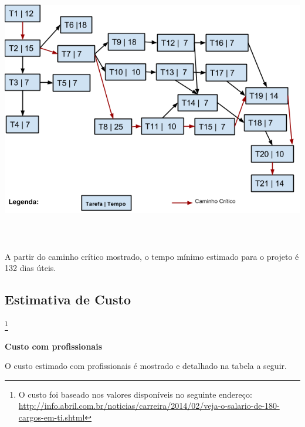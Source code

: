 {\centering  \includegraphics[width=16.722cm,height=11.834cm]{PlanodeProjeto-img002.png} \par}

\bigskip

A partir do caminho crítico mostrado, o tempo mínimo estimado para o projeto é 132 dias úteis.


\bigskip


\bigskip

\clearpage
\subsection{\textcolor[rgb]{0.078431375,0.09411765,0.13725491}{Estimativa de Custo}}\footnote{
\textcolor[rgb]{0.078431375,0.09411765,0.13725491}{O custo foi baseado nos valores disponíveis no seguinte endereço:
}\url{http://info.abril.com.br/noticias/carreira/2014/02/veja-o-salario-de-180-cargos-em-ti.shtml}\par }


\bigskip

\textbf{\textcolor[rgb]{0.078431375,0.09411765,0.13725491}{Custo com profissionais}}


\bigskip

\textcolor[rgb]{0.078431375,0.09411765,0.13725491}{O custo estimado com profissionais é mostrado e detalhado na tabela a
seguir.}


\bigskip


\bigskip

